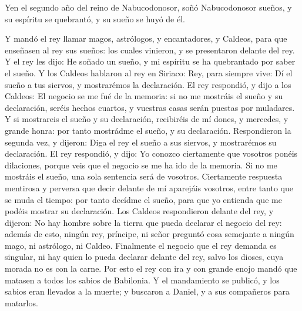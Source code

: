 \bchapter
\pagestyle{scrplain}


\vspace{\baselineskip}

\bversenonum \lettrine[lines=3,loversize=-0.2,lraise=0.2]{Y}{}en el segundo año del reino de Nabucodonosor, soñó Nabucodonosor sueños, y su espíritu se quebrantó, y su sueño se huyó de él.

\bverse Y mandó el rey llamar magos, astrólogos, y encantadores, y Caldeos, para que enseñasen al rey sus sueños: los cuales vinieron, y se presentaron delante del rey.
\bverse Y el rey les dijo: He soñado un sueño, y mi espíritu se ha quebrantado por saber el sueño.
\bverse Y los Caldeos hablaron al rey en Siriaco: Rey, para siempre vive: Dí el sueño a tus siervos, y mostrarémos la declaración.
\bverse El rey respondió, y dijo a los Caldeos: El negocio se me fué de la memoria: si no me mostráis el sueño y su declaración, seréis hechos cuartos, y vuestras casas serán puestas por muladares.
\bverse Y si mostrareis el sueño y su declaración, recibiréis de mí dones, y mercedes, y grande honra: por tanto mostrádme el sueño, y su declaración.
\bverse Respondieron la segunda vez, y dijeron: Diga el rey el sueño a sus siervos, y mostrarémos su declaración.
\bverse El rey respondió, y dijo: Yo conozco ciertamente que vosotros ponéis dilaciones, porque veis que el negocio se me ha ido de la memoria.
\bverse Si no me mostráis el sueño, una sola sentencia será de vosotros. Ciertamente respuesta mentirosa y perversa que decir delante de mí aparejáis vosotros, entre tanto que se muda el tiempo: por tanto decídme el sueño, para que yo entienda que me podéis mostrar su declaración.
\bverse Los Caldeos respondieron delante del rey, y dijeron: No hay hombre sobre la tierra que pueda declarar el negocio del rey: además de esto, ningún rey, príncipe, ni señor preguntó cosa semejante a ningún mago, ni astrólogo, ni Caldeo.
\bverse Finalmente el negocio que el rey demanda es singular, ni hay quien lo pueda declarar delante del rey, salvo los dioses, cuya morada no es con la carne.
\bverse Por esto el rey con ira y con grande enojo mandó que matasen a todos los sabios de Babilonia.
\bverse Y el mandamiento se publicó, y los sabios eran llevados a la muerte; y buscaron a Daniel, y a sus compañeros para matarlos.
